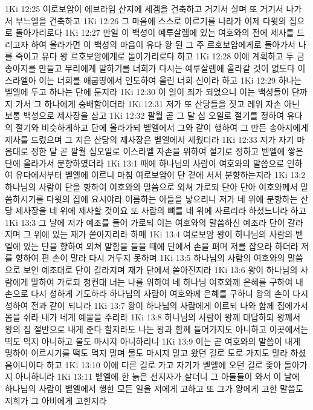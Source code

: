 1Ki 12:25  여로보암이 에브라임 산지에 세겜을 건축하고 거기서 살며 또 거기서 나가서 부느엘을 건축하고
1Ki 12:26  그 마음에 스스로 이르기를 나라가 이제 다윗의 집으로 돌아가리로다
1Ki 12:27  만일 이 백성이 예루살렘에 있는 여호와의 전에 제사를 드리고자 하여 올라가면 이 백성의 마음이 유다 왕 된 그 주 르호보암에게로 돌아가서 나를 죽이고 유다 왕 르호보암에게로 돌아가리로다 하고
1Ki 12:28  이에 계획하고 두 금송아지를 만들고 무리에게 말하기를 너희가 다시는 예루살렘에 올라갈 것이 없도다 이스라엘아 이는 너희를 애굽땅에서 인도하여 올린 너희 신이라 하고
1Ki 12:29  하나는 벧엘에 두고 하나는 단에 둔지라
1Ki 12:30  이 일이 죄가 되었으니 이는 백성들이 단까지 가서 그 하나에게 숭배함이더라
1Ki 12:31  저가 또 산당들을 짓고 레위 자손 아닌 보통 백성으로 제사장을 삼고
1Ki 12:32  팔월 곧 그 달 십 오일로 절기를 정하여 유다의 절기와 비슷하게하고 단에 올라가되 벧엘에서 그와 같이 행하여 그 만든 송아지에게 제사를 드렸으며 그 지은 산당의 제사장은 벧엘에서 세웠더라
1Ki 12:33  저가 자기 마음대로 정한 달 곧 팔월 십오일로 이스라엘 자손을 위하여 절기로 정하고 벧엘에 쌓은 단에 올라가서 분향하였더라
1Ki 13:1  때에 하나님의 사람이 여호와의 말씀으로 인하여 유다에서부터 벧엘에 이르니 마침 여로보암이 단 곁에 서서 분향하는지라
1Ki 13:2  하나님의 사람이 단을 향하여 여호와의 말씀으로 외쳐 가로되 단아 단아 여호와께서 말씀하시기를 다윗의 집에 요시야라 이름하는 아들을 낳으리니 저가 네 위에 분향하는 산당 제사장을 네 위에 제사할 것이요 또 사람의 뼈를 네 위에 사르리라 하셨느니라 하고
1Ki 13:3  그 날에 저가 예조를 들어 가로되 이는 여호와의 말씀하신 예조라 단이 갈라지며 그 위에 있는 재가 쏟아지리라 하매
1Ki 13:4  여로보암 왕이 하나님의 사람의 벧엘에 있는 단을 향하여 외쳐 말함을 들을 때에 단에서 손을 펴며 저를 잡으라 하더라 저를 향하여 편 손이 말라 다시 거두지 못하며
1Ki 13:5  하나님의 사람의 여호와의 말씀으로 보인 예조대로 단이 갈라지며 재가 단에서 쏟아진지라
1Ki 13:6  왕이 하나님의 사람에게 말하여 가로되 청컨대 너는 나를 위하여 네 하나님 여호와께 은혜를 구하여 내 손으로 다시 성하게 기도하라 하나님의 사람이 여호와께 은혜를 구하니 왕의 손이 다시 성하여 전과 같이 되니라
1Ki 13:7  왕이 하나님의 사람에게 이르되 나와 함께 집에가서 몸을 쉬라 내가 네게 예물을 주리라
1Ki 13:8  하나님의 사람이 왕께 대답하되 왕께서 왕의 집 절반으로 내게 준다 할지라도 나는 왕과 함께 들어가지도 아니하고 이곳에서는 떡도 먹지 아니하고 물도 마시지 아니하리니
1Ki 13:9  이는 곧 여호와의 말씀이 내게 명하여 이르시기를 떡도 먹지 말며 물도 마시지 말고 왔던 길로 도로 가지도 말라 하셨음이니이다 하고
1Ki 13:10  이에 다른 길로 가고 자기가 벧엘에 오던 길로 좇아 돌아가지 아니하니라
1Ki 13:11  벧엘에 한 늙은 선지자가 살더니 그 아들들이 와서 이 날에 하나님의 사람이 벧엘에서 행한 모든 일을 저에게 고하고 또 그가 왕에게 고한 말씀도 저희가 그 아비에게 고한지라

